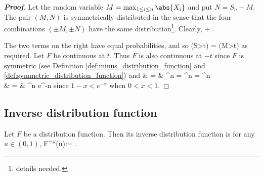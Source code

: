 \begin{proof}[\bf Proof]
Let the random variable $M = \max_{1\leq i\leq n} \abs{X_i}$ and put $N = S_n - M$. The pair $(M,N)$ is symmetrically distributed in the sense that the four combinations $(\pm M,\pm N)$ have the same distribution\footnote{details needed.}. Clearly,
\be
\pro{} \leq \pro{} + \pro{}.
\ee

The two terms on the right have equal probabilities, and so
\be
\pro(S>t) = \pro{} \geq \pro{} \geq {}\pro(M>t)
\ee
as required. Let $F$ be continuous at $t$. Thus $F$ is also continuous at $-t$ since $F$ is symmetric (see Definition \ref{def:minus_distribution_function} and \ref{def:symmetric_distribution_function}) and
\beast
\pro{} & = & ^n = ^n = ^n \\
& = & ^n \leq e^{-n}
\eeast
since $1-x<e^{-x}$ when $0<x<1$.
\end{proof}




\subsection{Inverse distribution function}

\begin{definition}
Let $F$ be a distribution function. Then its inverse distribution function is for any $u\in (0,1)$,
\be
F^*(u):= \inf{}.
\ee
\end{definition}



